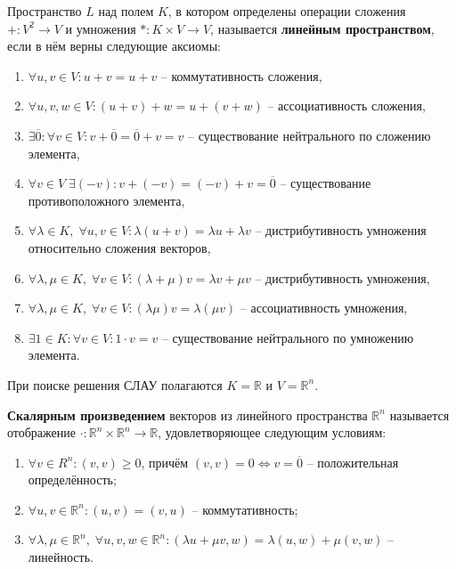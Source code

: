 \documentclass{article}
\begin{document}
\begin{define}
	Пространство $L$ над полем $K$, в котором определены операции сложения
	$+: V^2\rightarrow V$ и умножения $*: K\times V\rightarrow V$,
	называется \textbf{линейным пространством}, если в нём верны следующие
	аксиомы:

	\begin{enumerate}[nosep]
		\item $\forall u,v\in V: u+v=u+v$ -- коммутативность сложения,
		\item $\forall u,v,w\in V: (u+v)+w=u+(v+w)$ -- ассоциативность
			сложения,
		\item $\exists\overline{0}: \forall v\in V:
			v+\overline{0}=\overline{0}+v=v$ -- существование
			нейтрального по сложению элемента,
		\item $\forall v\in V\;\exists (-v): v+(-v)=(-v)+v=\overline{0}$
			-- существование противоположного элемента,
		\item $\forall\lambda\in K,\;\forall u,v\in V: \lambda(u+v)=
			\lambda u+\lambda v$ -- дистрибутивность умножения
			относительно сложения векторов,
		\item $\forall\lambda,\mu\in K,\;\forall v\in V:
			(\lambda+\mu)v=\lambda v+\mu v$ -- дистрибутивность
			умножения,
		\item $\forall\lambda,\mu\in K,\;\forall v\in V: (\lambda\mu)v=
			\lambda(\mu v)$ -- ассоциативность умножения,
		\item $\exists 1\in K: \forall v\in V: 1\cdot v=v$ --
			существование нейтрального по умножению элемента.
	\end{enumerate}
\end{define}

При поиске решения СЛАУ полагаются $K=\mathbb R$ и $V=\mathbb R^n$.

\begin{define}
	\textbf{Скалярным произведением} векторов из линейного пространства
	$\mathbb R^n$ называется отображение $\cdot: \mathbb R^n\times
	\mathbb R^n\rightarrow \mathbb R$, удовлетворяющее следующим условиям:
	\begin{enumerate}[nosep]
		\item $\forall v\in R^n: (v,v)\ge 0$, причём $(v,v)=0
			\Leftrightarrow v=\overline{0}$ -- положительная
			определённость;
		\item $\forall u,v\in \mathbb R^n: (u,v)=(v,u)$ --
			коммутативность;
		\item $\forall \lambda,\mu \in\mathbb R^n,\;
			\forall u,v,w\in \mathbb R^n: (\lambda u+\mu v, w)=
			\lambda(u,w)+\mu(v,w)$ -- линейность.
	\end{enumerate}
\end{define}
\newpage
\end{document}
